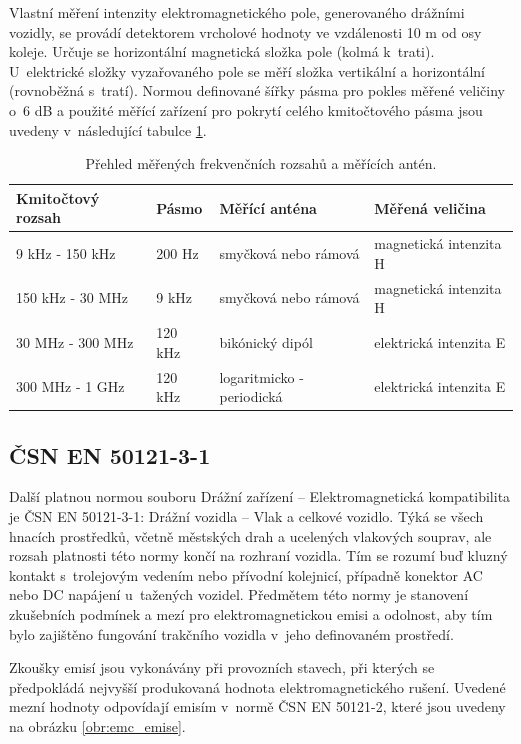 Vlastní měření intenzity elektromagnetického pole, generovaného drážními vozidly, se provádí detektorem vrcholové hodnoty ve vzdálenosti 10 m od osy koleje. Určuje se horizontální magnetická složka pole (kolmá k~trati). U~elektrické složky vyzařovaného pole se měří složka vertikální a horizontální (rovnoběžná s~tratí). Normou definované šířky pásma pro pokles měřené veličiny o~6 dB  a použité měřící zařízení pro pokrytí celého kmitočtového pásma jsou uvedeny v~následující tabulce \ref{tab:emc_fr_rozsah}.

\begin{table}[!h]
\begin{center}
  	\caption{Přehled měřených frekvenčních rozsahů a měřících antén.}
  	\label{tab:emc_fr_rozsah}
\begin{tabular}{|l|l|l|l|}
	\hline
	{\bf Kmitočtový rozsah} & {\bf Pásmo} & {\bf Měřící anténa} & {\bf Měřená veličina} \\
	\hline
	\hline
	9 kHz - 150 kHz	& 200 Hz	& smyčková nebo rámová	& magnetická intenzita  H \\
	150 kHz - 30 MHz	& 9 kHz	& smyčková nebo rámová	& magnetická intenzita H \\
	30 MHz - 300 MHz	& 120 kHz	& bikónický dipól		& elektrická intenzita E \\
	300 MHz - 1 GHz	& 120 kHz	& logaritmicko - periodická	& elektrická intenzita E \\
  	\hline
\end{tabular}
\end{center}
\end{table}

\subsection{ČSN EN 50121-3-1}
Další platnou normou souboru Drážní zařízení – Elektromagnetická kompatibilita je ČSN EN 50121-3-1: Drážní vozidla – Vlak a celkové vozidlo. Týká se všech hnacích prostředků, včetně městských drah a ucelených vlakových souprav, ale rozsah platnosti této normy končí na rozhraní vozidla. Tím se rozumí buď kluzný kontakt s~trolejovým vedením nebo přívodní kolejnicí, případně konektor AC nebo DC napájení u~tažených vozidel. Předmětem této normy je stanovení zkušebních podmínek a mezí pro elektromagnetickou emisi a odolnost, aby tím bylo zajištěno fungování trakčního vozidla v~jeho definovaném prostředí. 

Zkoušky emisí jsou vykonávány při provozních stavech, při kterých se předpokládá nejvyšší produkovaná hodnota elektromagnetického rušení. Uvedené mezní hodnoty odpovídají emisím v~normě ČSN EN 50121-2, které jsou uvedeny na obrázku \ref{obr:emc_emise}.

